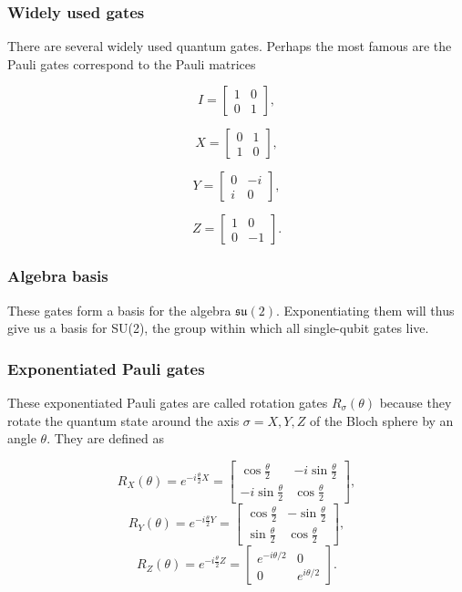 \documentclass{beamer}
\begin{document}
\begin{frame}
\frametitle{Widely used gates}

There are several widely used quantum gates. Perhaps the most famous are 
the Pauli gates correspond to the Pauli matrices

\[
I=\begin{bmatrix} 1 & 0 \\ 0 & 1 \end{bmatrix},
\]

\[
X =\begin{bmatrix} 0 & 1 \\ 1 & 0\end{bmatrix},
\]

\[
Y=\begin{bmatrix}0 & -i \\i & 0\end{bmatrix},
\]

\[
Z=\begin{bmatrix} 1 & 0 \\ 0 & -1\end{bmatrix}.
\]
\end{frame}

\begin{frame}
\frametitle{Algebra basis}

These gates form a basis for
the algebra $\mathfrak{su}(2)$. Exponentiating them will thus give us
a basis for SU(2), the group within which all single-qubit gates
live.
\end{frame}

\begin{frame}
\frametitle{Exponentiated Pauli gates}

These exponentiated Pauli gates are called rotation gates
$R_{\sigma}(\theta)$ because they rotate the quantum state around the
axis $\sigma=X,Y,Z$ of the Bloch sphere by an angle $\theta$. They are
defined as

\[
R_X(\theta)=e^{-i\frac{\theta}{2}X}=
\begin{bmatrix}
\cos\frac{\theta}{2} & -i\sin\frac{\theta}{2} \\
-i\sin\frac{\theta}{2} & \cos\frac{\theta}{2} 
\end{bmatrix},
\]
\[
R_Y(\theta)=e^{-i\frac{\theta}{2}Y}=
\begin{bmatrix}
\cos\frac{\theta}{2} & -\sin\frac{\theta}{2} \\
\sin\frac{\theta}{2} & \cos\frac{\theta}{2} 
\end{bmatrix},
\]
\[
R_Z(\theta)=e^{-i\frac{\theta}{2}Z}=\begin{bmatrix}
e^{-i\theta/2} & 0 \\
0 & e^{i\theta/2}\end{bmatrix}.
\]
\end{frame}
\end{document}
